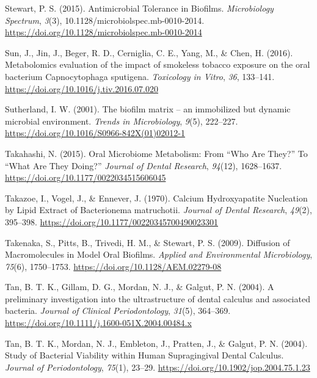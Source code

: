 \documentclass[
  letterpaper,
]{book}
\newlength{\cslhangindent}
\newlength{\cslentryspacingunit} %
\newenvironment{CSLReferences}[2] %
 {%
  \setlength{\parindent}{0pt}
  \ifodd #1
  \let\oldpar\par
  \def\par{\hangindent=\cslhangindent\oldpar}
  \fi
  \setlength{\parskip}{#2\cslentryspacingunit}
 }%
 {}
\begin{document}
\begin{CSLReferences}{1}{0}
\leavevmode{}%
Stewart, P. S. (2015). Antimicrobial {Tolerance} in {Biofilms}.
\emph{Microbiology Spectrum}, \emph{3}(3),
10.1128/microbiolspec.mb-0010-2014.
\url{https://doi.org/10.1128/microbiolspec.mb-0010-2014}

\leavevmode{}%
Sun, J., Jin, J., Beger, R. D., Cerniglia, C. E., Yang, M., \& Chen, H.
(2016). Metabolomics evaluation of the impact of smokeless tobacco
exposure on the oral bacterium {Capnocytophaga} sputigena.
\emph{Toxicology in Vitro}, \emph{36}, 133--141.
\url{https://doi.org/10.1016/j.tiv.2016.07.020}

\leavevmode{}%
Sutherland, I. W. (2001). The biofilm matrix -- an immobilized but
dynamic microbial environment. \emph{Trends in Microbiology},
\emph{9}(5), 222--227.
\url{https://doi.org/10.1016/S0966-842X(01)02012-1}

\leavevmode{}%
Takahashi, N. (2015). Oral {Microbiome Metabolism}: {From} {``{Who Are
They}?''} To {``{What Are They Doing}?''} \emph{Journal of Dental
Research}, \emph{94}(12), 1628--1637.
\url{https://doi.org/10.1177/0022034515606045}

\leavevmode{}%
Takazoe, I., Vogel, J., \& Ennever, J. (1970). Calcium {Hydroxyapatite
Nucleation} by {Lipid Extract} of {Bacterionema} matruchotii.
\emph{Journal of Dental Research}, \emph{49}(2), 395--398.
\url{https://doi.org/10.1177/00220345700490023301}

\leavevmode{}%
Takenaka, S., Pitts, B., Trivedi, H. M., \& Stewart, P. S. (2009).
Diffusion of {Macromolecules} in {Model Oral Biofilms}. \emph{Applied
and Environmental Microbiology}, \emph{75}(6), 1750--1753.
\url{https://doi.org/10.1128/AEM.02279-08}

\leavevmode{}%
Tan, B. T. K., Gillam, D. G., Mordan, N. J., \& Galgut, P. N. (2004). A
preliminary investigation into the ultrastructure of dental calculus and
associated bacteria. \emph{Journal of Clinical Periodontology},
\emph{31}(5), 364--369.
\url{https://doi.org/10.1111/j.1600-051X.2004.00484.x}

\leavevmode{}%
Tan, B. T. K., Mordan, N. J., Embleton, J., Pratten, J., \& Galgut, P.
N. (2004). Study of {Bacterial Viability} within {Human Supragingival
Dental Calculus}. \emph{Journal of Periodontology}, \emph{75}(1),
23--29. \url{https://doi.org/10.1902/jop.2004.75.1.23}


\end{CSLReferences}
\end{document}
